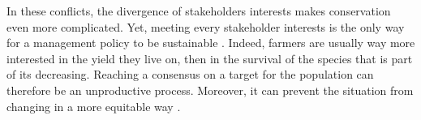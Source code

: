\documentclass[12pt,a4paper]{article}
\begin{document}
In these conflicts, the divergence of stakeholders interests makes conservation even more complicated.
Yet, meeting every stakeholder interests is the only way for a management policy to be sustainable \citep{redpath2013understanding}.
Indeed, farmers are usually way more interested in the yield they live on, then in the survival of the species that is part of its decreasing.
Reaching a consensus on a target for the population can therefore be an unproductive process.
Moreover, it can prevent the situation from changing in a more equitable way \citep{peterson2005conservation}.\\
%
\end{document}

